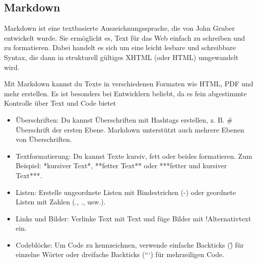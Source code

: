 \subsection{ Markdown }

Markdown ist eine textbasierte Auszeichnungssprache, die von John Gruber entwickelt wurde. Sie ermöglicht es, Text für das Web einfach 
zu schreiben und zu formatieren. Dabei handelt es sich um eine leicht lesbare und schreibbare Syntax, die dann in strukturell gültiges 
XHTML (oder HTML) umgewandelt wird.

Mit Markdown kannst du Texte in verschiedenen Formaten wie HTML, PDF und mehr erstellen. Es ist besonders bei Entwicklern beliebt, 
da es fein abgestimmte Kontrolle über Text und Code bietet

\begin{itemize}
    \item Überschriften: Du kannst Überschriften mit Hashtags erstellen, z. B. \# Überschrift der ersten Ebene. Markdown unterstützt auch mehrere Ebenen von Überschriften.
    \item Textformatierung: Du kannst Texte kursiv, fett oder beides formatieren. Zum Beispiel: *kursiver Text*, **fetter Text** oder ***fetter und kursiver Text***.
    \item Listen: Erstelle ungeordnete Listen mit Bindestrichen (-) oder geordnete Listen mit Zahlen (., ., usw.).
    \item Links und Bilder: Verlinke Text mit Text und füge Bilder mit !Alternativtext ein.
    \item Codeblöcke: Um Code zu kennzeichnen, verwende einfache Backticks (\`) für einzelne Wörter oder dreifache Backticks (```) für mehrzeiligen Code.
\end{itemize}
